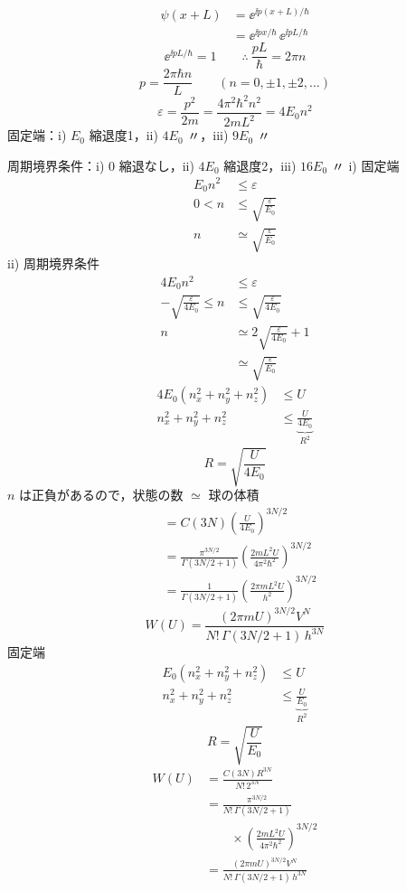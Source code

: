 \begin{align*}
\psi(x+L)&=\ee^{\ii p(x+L)/\hbar}\\
&=\ee^{\ii px/\hbar}\,\ee^{\ii pL/\hbar}
\end{align*}
\[ \ee^{\ii pL/\hbar}=1\qquad\therefore\ \frac{pL}{\hbar}=2\pi n \]
\[ p=\frac{2\pi\hbar n}{L}\qquad(n=0,\pm1,\pm2,\dots) \]
\[ \varepsilon=\frac{p^{2}}{2m}=\frac{4\pi^{2}\hbar^{2}n^{2}}{2mL^{2}}=4E_{0}n^{2} \]
固定端：i) $E_{0}$ 縮退度1，ii) $4E_{0}$ 〃，iii) $9E_{0}$ 〃

周期境界条件：i) $0$ 縮退なし，ii) $4E_{0}$ 縮退度2，iii) $16E_{0}$ 〃
i) 固定端
\begin{align*}
E_{0}n^{2}&\le\varepsilon\\
0<n&\le\sqrt{\frac{\varepsilon}{E_{0}}}\\
n&\simeq\sqrt{\frac{\varepsilon}{E_{0}}}
\end{align*}
ii) 周期境界条件
\begin{align*}
4E_{0}n^{2}&\le\varepsilon\\
-\sqrt{\frac{\varepsilon}{4E_{0}}}\le n&\le\sqrt{\frac{\varepsilon}{4E_{0}}}\\
n&\simeq2\sqrt{\frac{\varepsilon}{4E_{0}}}+1\\
&\simeq\sqrt{\frac{\varepsilon}{E_{0}}}
\end{align*}
\begin{align*}
4E_{0}(n_{x}^{2}+n_{y}^{2}+n_{z}^{2})&\le U\\
n_{x}^{2}+n_{y}^{2}+n_{z}^{2}&\le\underbrace{\frac{U}{4E_{0}}}_{R^{2}}
\end{align*}
\[ R=\sqrt{\frac{U}{4E_{0}}} \]
$n$ は正負があるので，状態の数 $\simeq$ 球の体積
\begin{align*}
&=C(3N)\left(\frac{U}{4E_{0}}\right)^{3N/2}\\
&=\frac{\pi^{3N/2}}{\Gamma(3N/2+1)}\left(\frac{2mL^{2}U}{4\pi^{2}\hbar^{2}}\right)^{3N/2}\\
&=\frac{1}{\Gamma(3N/2+1)}\left(\frac{2\pi mL^{2}U}{h^{2}}\right)^{3N/2}
\end{align*}
\[ W(U)=\frac{(2\pi mU)^{3N/2}V^{N}}{N!\,\Gamma(3N/2+1)\,h^{3N}} \]
固定端
\begin{align*}
E_{0}(n_{x}^{2}+n_{y}^{2}+n_{z}^{2})&\le U\\
n_{x}^{2}+n_{y}^{2}+n_{z}^{2}&\le\underbrace{\frac{U}{E_{0}}}_{R^{2}}
\end{align*}
\[ R=\sqrt{\frac{U}{E_{0}}} \]
\begin{align*}
W(U)&=\frac{C(3N)R^{3N}}{N!\,2^{3N}}\\
&=\frac{\pi^{3N/2}}{N!\,\Gamma(3N/2+1)}\\
&\qquad\times\left(\frac{2mL^{2}U}{4\pi^{2}\hbar^{2}}\right)^{3N/2}\\
&=\frac{(2\pi mU)^{3N/2}V^{N}}{N!\,\Gamma(3N/2+1)\,h^{3N}}
\end{align*}
